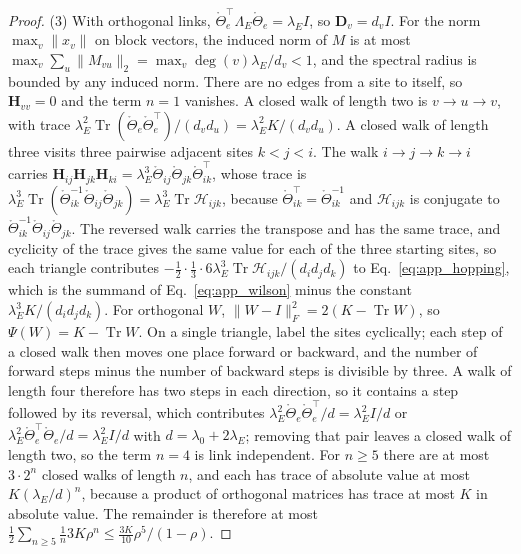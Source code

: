 \documentclass[twoside,11pt]{article}
\begin{document}
\begin{proof}
(3) With orthogonal links, $\mathring\Theta_e^\top\Lambda_E\mathring\Theta_e=\lambda_EI$, so $\mathbf D_v=d_vI$. For the norm $\max_v\|x_v\|$ on block vectors, the induced norm of $M$ is at most $\max_v\sum_u\|M_{vu}\|_2=\max_v\deg(v)\lambda_E/d_v<1$, and the spectral radius is bounded by any induced norm. There are no edges from a site to itself, so $\mathbf H_{vv}=0$ and the term $n=1$ vanishes. A closed walk of length two is $v\to u\to v$, with trace $\lambda_E^2\operatorname{Tr}(\mathring\Theta_e\mathring\Theta_e^\top)/(d_vd_u)=\lambda_E^2K/(d_vd_u)$. A closed walk of length three visits three pairwise adjacent sites $k<j<i$. The walk $i\to j\to k\to i$ carries $\mathbf H_{ij}\mathbf H_{jk}\mathbf H_{ki}=\lambda_E^3\mathring\Theta_{ij}\mathring\Theta_{jk}\mathring\Theta_{ik}^\top$, whose trace is $\lambda_E^3\operatorname{Tr}(\mathring\Theta_{ik}^{-1}\mathring\Theta_{ij}\mathring\Theta_{jk})=\lambda_E^3\operatorname{Tr}\mathcal H_{ijk}$, because $\mathring\Theta_{ik}^\top=\mathring\Theta_{ik}^{-1}$ and $\mathcal H_{ijk}$ is conjugate to $\mathring\Theta_{ik}^{-1}\mathring\Theta_{ij}\mathring\Theta_{jk}$. The reversed walk carries the transpose and has the same trace, and cyclicity of the trace gives the same value for each of the three starting sites, so each triangle contributes $-\tfrac12\cdot\tfrac13\cdot6\lambda_E^3\operatorname{Tr}\mathcal H_{ijk}/(d_id_jd_k)$ to Eq.~\eqref{eq:app_hopping}, which is the summand of Eq.~\eqref{eq:app_wilson} minus the constant $\lambda_E^3K/(d_id_jd_k)$. For orthogonal $W$, $\|W-I\|_F^2=2(K-\operatorname{Tr}W)$, so $\Psi(W)=K-\operatorname{Tr}W$. On a single triangle, label the sites cyclically; each step of a closed walk then moves one place forward or backward, and the number of forward steps minus the number of backward steps is divisible by three. A walk of length four therefore has two steps in each direction, so it contains a step followed by its reversal, which contributes $\lambda_E^2\mathring\Theta_e\mathring\Theta_e^\top/d=\lambda_E^2I/d$ or $\lambda_E^2\mathring\Theta_e^\top\mathring\Theta_e/d=\lambda_E^2I/d$ with $d=\lambda_0+2\lambda_E$; removing that pair leaves a closed walk of length two, so the term $n=4$ is link independent. For $n\ge5$ there are at most $3\cdot2^n$ closed walks of length $n$, and each has trace of absolute value at most $K(\lambda_E/d)^n$, because a product of orthogonal matrices has trace at most $K$ in absolute value. The remainder is therefore at most $\tfrac12\sum_{n\ge5}\tfrac1n3K\rho^n\le\tfrac{3K}{10}\rho^5/(1-\rho)$.
\end{proof}
\end{document}
